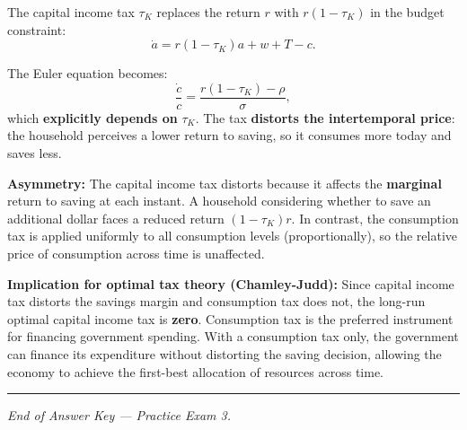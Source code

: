 \documentclass[a4paper,11pt]{article}
\begin{document}
\begin{answerbox}
The capital income tax $\tau_K$ replaces the return $r$ with $r(1-\tau_K)$ in the budget constraint:
\[
    \dot{a} = r(1-\tau_K)a + w + T - c.
\]

The Euler equation becomes:
\[
    \frac{\dot{c}}{c} = \frac{r(1-\tau_K) - \rho}{\sigma},
\]
which \textbf{explicitly depends on} $\tau_K$. The tax \textbf{distorts the intertemporal price}: the household perceives a lower return to saving, so it consumes more today and saves less.

\textbf{Asymmetry:} The capital income tax distorts because it affects the \textbf{marginal} return to saving at each instant. A household considering whether to save an additional dollar faces a reduced return $(1-\tau_K)r$. In contrast, the consumption tax is applied uniformly to all consumption levels (proportionally), so the relative price of consumption across time is unaffected.

\textbf{Implication for optimal tax theory (Chamley-Judd):} Since capital income tax distorts the savings margin and consumption tax does not, the long-run optimal capital income tax is \textbf{zero}. Consumption tax is the preferred instrument for financing government spending. With a consumption tax only, the government can finance its expenditure without distorting the saving decision, allowing the economy to achieve the first-best allocation of resources across time.
\end{answerbox}

\vspace{12pt}
\noindent\rule{\textwidth}{0.4pt}
\begin{center}\textit{End of Answer Key --- Practice Exam 3.}\end{center}
\end{document}
